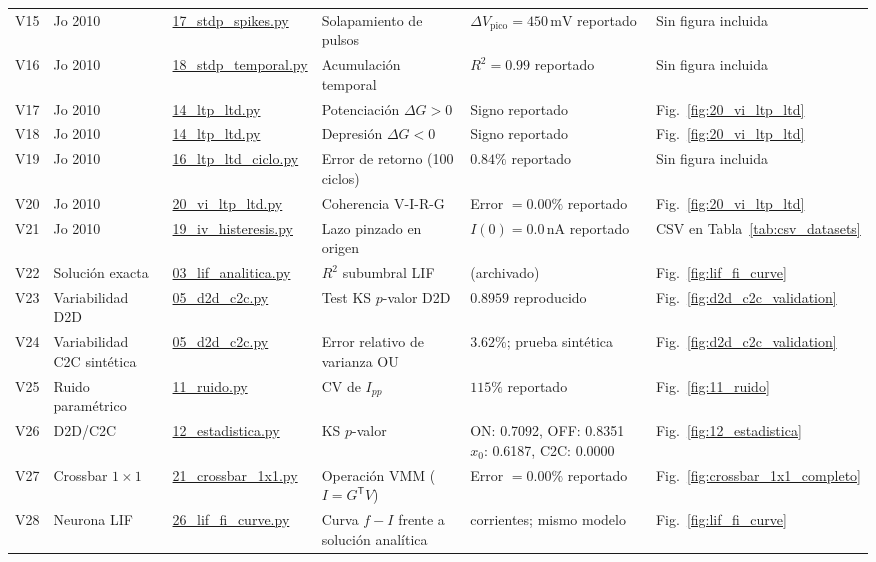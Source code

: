 {\begin{longtable}{c >{\raggedright\arraybackslash}p{2.1cm} >{\raggedright\arraybackslash}p{2.4cm} >{\raggedright\arraybackslash}p{2.0cm} >{\raggedright\arraybackslash}p{4.1cm} >{\raggedright\arraybackslash}p{2.2cm}}
V15 & Jo 2010 & \url{17_stdp_spikes.py} & Solapamiento de pulsos & $\Delta V_{\mathrm{pico}}=450\,\mathrm{mV}$ reportado & Sin figura incluida \\
V16 & Jo 2010 & \url{18_stdp_temporal.py} & Acumulación temporal & $R^2=0.99$ reportado & Sin figura incluida \\
V17 & Jo 2010 & \url{14_ltp_ltd.py} & Potenciación $\Delta G>0$ & Signo reportado & Fig.~\ref{fig:20_vi_ltp_ltd} \\
V18 & Jo 2010 & \url{14_ltp_ltd.py} & Depresión $\Delta G<0$ & Signo reportado & Fig.~\ref{fig:20_vi_ltp_ltd} \\
V19 & Jo 2010 & \url{16_ltp_ltd_ciclo.py} & Error de retorno (100 ciclos) & $0.84\%$ reportado & Sin figura incluida \\
V20 & Jo 2010 & \url{20_vi_ltp_ltd.py} & Coherencia V-I-R-G & Error $=0.00\%$ reportado & Fig.~\ref{fig:20_vi_ltp_ltd} \\
V21 & Jo 2010 & \url{19_iv_histeresis.py} & Lazo pinzado en origen & $I(0)=0.0\,\mathrm{nA}$ reportado & CSV en Tabla~\ref{tab:csv_datasets} \\
V22 & Solución exacta & \url{03_lif_analitica.py} & $R^2$ subumbral LIF & 0.9999815 (archivado) & Fig.~\ref{fig:lif_fi_curve} \\
V23 & Variabilidad D2D & \url{05_d2d_c2c.py} & Test KS $p$-valor D2D & $0.8959$ reproducido & Fig.~\ref{fig:d2d_c2c_validation} \\
V24 & Variabilidad C2C sintética & \url{05_d2d_c2c.py} & Error relativo de varianza OU~\cite{35} & $3.62\%$; prueba sintética & Fig.~\ref{fig:d2d_c2c_validation} \\
V25 & Ruido paramétrico & \url{11_ruido.py} & CV de $I_{pp}$ & $115\%$ reportado & Fig.~\ref{fig:11_ruido} \\
V26 & D2D/C2C & \url{12_estadistica.py} & KS $p$-valor & \shortstack{ON: 0.7092, OFF: 0.8351\\$x_0$: 0.6187, C2C: 0.0000} & Fig.~\ref{fig:12_estadistica} \\
V27 & Crossbar $1\times1$ & \url{21_crossbar_1x1.py} & Operación VMM ($I=G^{\mathsf T}V$) & Error $=0.00\%$ reportado & Fig.~\ref{fig:crossbar_1x1_completo} \\
V28 & Neurona LIF & \url{26_lif_fi_curve.py} & Curva $f-I$ frente a solución analítica & 14 corrientes; mismo modelo & Fig.~\ref{fig:lif_fi_curve} \\
\end{longtable}
}


